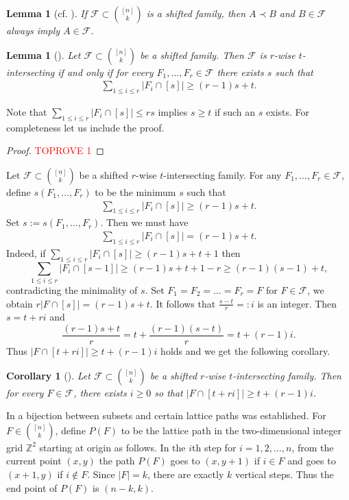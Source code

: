 \documentclass[11pt,a4paper]{article}
\newtheorem{lem}[thm]{Lemma}
\newtheorem{false statement}{False statement}
\newtheorem{cor}[thm]{Corollary}
\theoremstyle{definition}
\def\hf{\mathcal{F}}
\begin{document}
\begin{lem}[cf. \cite{F87}]
If $\hf\subset \binom{[n]}{k}$ is a shifted family, then $A\prec B$ and $B\in \hf$ always imply $A\in \hf$.
\end{lem}


\begin{lem}[\cite{F87}]\label{lem-2.4}
Let $\hf\subset  \binom{[n]}{k}$ be a shifted family. Then $\hf$ is $r$-wise $t$-intersecting if and only if
for every $F_1,\ldots,F_r\in \hf$ there exists $s$ such that
\begin{align}\label{ineq-2.5}
\sum_{1\leq i\leq r} |F_i\cap [s]| \geq (r-1) s+t.
\end{align}
\end{lem}

Note that $\sum\limits_{1\leq i\leq r} |F_i\cap [s]|\leq rs$ implies $s\geq t$ if such an $s$ exists.  For completeness let us include the proof.

\begin{proof}\textcolor{red}{TOPROVE 1}\end{proof}

Let $\hf\subset  \binom{[n]}{k}$ be a shifted $r$-wise $t$-intersecting family.  For any $F_1,\ldots,F_r\in \hf$, define $s(F_1,\ldots,F_r)$ to be the minimum $s$ such that
\begin{align*}
\sum_{1\leq i\leq r} |F_i\cap [s]| \geq (r-1) s+t.
\end{align*}
Set $s:=s(F_1,\ldots,F_r)$. Then we must have
\begin{align*}
\sum_{1\leq i\leq r} |F_i\cap [s]| = (r-1) s+t.
\end{align*}
Indeed, if $\sum\limits_{1\leq i\leq r} |F_i\cap [s]| \geq  (r-1) s+t+1$ then
\[
\sum_{1\leq i\leq r} |F_i\cap [s-1]| \geq  (r-1) s+t+1 -r\geq (r-1)(s-1)+t,
\]
contradicting the minimality of $s$. Set $F_1=F_2=\ldots =F_r=F$ for $F\in \hf$, we obtain $r |F\cap [s]| = (r-1) s+t$.
It follows that $\frac{s-t}{r}=:i$ is an integer.  Then $s=t+ri$ and
\[
\frac{(r-1) s+t}{r}=t+\frac{(r-1)(s-t)}{r} =t+(r-1)i.
\]
Thus $|F\cap [t+ri]|\geq t+(r-1)i$ holds and  we get the following corollary.

\begin{cor} [\cite{F87}]\label{cor-2.2}
Let $\hf\subset \binom{[n]}{k}$ be a shifted $r$-wise $t$-intersecting family. Then for every $F\in \hf$, there exists $i\geq 0$ so that $|F\cap [t+ri]|\geq t+(r-1)i$.
\end{cor}

In \cite{F78} a bijection between subsets and certain lattice paths was established. For $F\in \binom{[n]}{k}$, define  $P(F)$ to be the lattice path in the two-dimensional integer grid $\mathbb{Z}^2$ starting at origin as follows. In the $i$th step for $i=1,2,\ldots,n$,  from the current point $(x,y)$ the path $P(F)$ goes to $(x,y+1)$ if $i\in F$ and goes to $(x+1,y)$ if $i\notin F$.  Since $|F|=k$, there are exactly $k$ vertical steps. Thus the end point of $P(F)$ is $(n-k,k)$.
\end{document}
